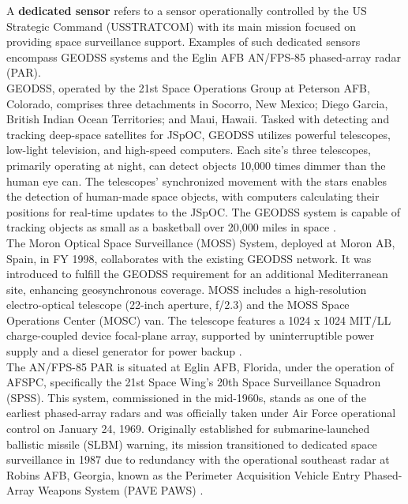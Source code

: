 A \textbf{dedicated sensor} refers to a sensor operationally controlled by the US Strategic Command (USSTRATCOM) with its main mission focused on providing space surveillance support. Examples of such dedicated sensors encompass GEODSS systems and the Eglin AFB AN/FPS-85 phased-array radar (PAR)\cite{usssn}.\\

GEODSS, operated by the 21st Space Operations Group at Peterson AFB, Colorado, comprises three detachments in Socorro, New Mexico; Diego Garcia, British Indian Ocean Territories; and Maui, Hawaii. Tasked with detecting and tracking deep-space satellites for JSpOC, GEODSS utilizes powerful telescopes, low-light television, and high-speed computers. Each site's three telescopes, primarily operating at night, can detect objects 10,000 times dimmer than the human eye can. The telescopes' synchronized movement with the stars enables the detection of human-made space objects, with computers calculating their positions for real-time updates to the JSpOC. The GEODSS system is capable of tracking objects as small as a basketball over 20,000 miles in space \cite{usssn}.\\

The Moron Optical Space Surveillance (MOSS) System, deployed at Moron AB, Spain, in FY 1998, collaborates with the existing GEODSS network. It was introduced to fulfill the GEODSS requirement for an additional Mediterranean site, enhancing geosynchronous coverage. MOSS includes a high-resolution electro-optical telescope (22-inch aperture, f/2.3) and the MOSS Space Operations Center (MOSC) van. The telescope features a 1024 x 1024 MIT/LL charge-coupled device focal-plane array, supported by uninterruptible power supply and a diesel generator for power backup \cite{usssn}.\\

The AN/FPS-85 PAR is situated at Eglin AFB, Florida, under the operation of AFSPC, specifically the 21st Space Wing's 20th Space Surveillance Squadron (SPSS). This system, commissioned in the mid-1960s, stands as one of the earliest phased-array radars and was officially taken under Air Force operational control on January 24, 1969. Originally established for submarine-launched ballistic missile (SLBM) warning, its mission transitioned to dedicated space surveillance in 1987 due to redundancy with the operational southeast radar at Robins AFB, Georgia, known as the Perimeter Acquisition Vehicle Entry Phased-Array Weapons System (PAVE PAWS) \cite{usssn}.\\

